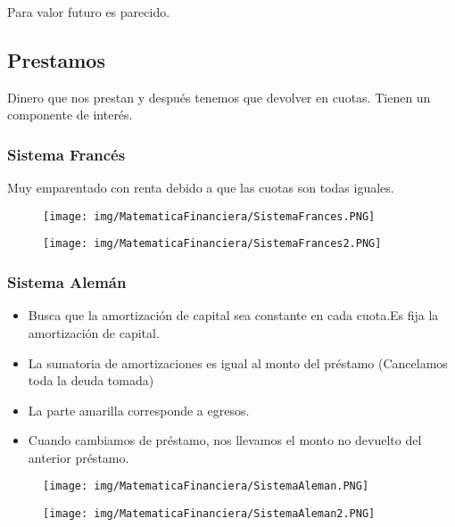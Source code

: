 \documentclass[titlepage,a4paper]{article}
\begin{document}
Para valor futuro es parecido.

\newpage
\subsection{Prestamos}

Dinero que nos prestan y después tenemos que devolver en cuotas. Tienen un componente de interés.

\subsubsection{Sistema Francés}

Muy emparentado con renta debido a que las cuotas son todas iguales.

\begin{figure}[!htb]
    \centering
    \texttt{[image: img/MatematicaFinanciera/SistemaFrances.PNG]}
\end{figure}


\begin{figure}[!htb]
    \centering
    \texttt{[image: img/MatematicaFinanciera/SistemaFrances2.PNG]}
\end{figure}

\newpage
\subsubsection{Sistema Alemán}
\begin{itemize}
\item Busca que la amortización de capital sea constante en cada cuota.Es fija la amortización de capital.
\item La sumatoria de amortizaciones es igual al monto del préstamo (Cancelamos toda la deuda tomada)
\item La parte amarilla corresponde a egresos.
\item Cuando cambiamos de préstamo, nos llevamos el monto no devuelto del anterior préstamo.%
\end{itemize}


\begin{figure}[!htb]
    \centering
    \texttt{[image: img/MatematicaFinanciera/SistemaAleman.PNG]}
\end{figure}

\begin{figure}[!htb]
    \centering
    \texttt{[image: img/MatematicaFinanciera/SistemaAleman2.PNG]}
\end{figure}
\end{document}
